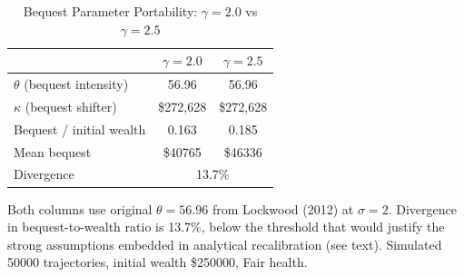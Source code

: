 \begin{table}[htbp]
\centering
\caption{Bequest Parameter Portability: $\gamma = 2.0$ vs $\gamma = 2.5$}
\label{tab:bequest_recal}
\begin{tabular}{lcc}
\toprule
 & $\gamma = 2.0$ & $\gamma = 2.5$ \\
\midrule
$\theta$ (bequest intensity) & 56.96 & 56.96 \\
$\kappa$ (bequest shifter) & \$272,628 & \$272,628 \\
Bequest / initial wealth & 0.163 & 0.185 \\
Mean bequest & \$40765 & \$46336 \\
Divergence & \multicolumn{2}{c}{13.7\%} \\
\bottomrule
\end{tabular}
\begin{tablenotes}
\small
\item Both columns use original $\theta = 56.96$ from Lockwood (2012) at $\sigma = 2$.
Divergence in bequest-to-wealth ratio is 13.7\%, below the threshold that would
justify the strong assumptions embedded in analytical recalibration (see text).
Simulated 50000 trajectories, initial wealth \$250000, Fair health.
\end{tablenotes}
\end{table}

